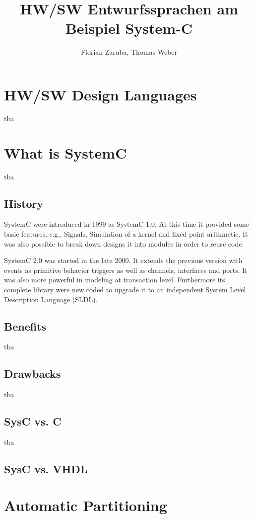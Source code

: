 \documentclass{article}
\begin{document}
	\title{HW/SW Entwurfssprachen am Beispiel System-C}
	\author{Florian Zaruba, Thomas Weber}

	\maketitle


	\section{HW/SW Design Languages}
	tba
	\section{What is SystemC}
	tba
	  \subsection{History}
	    SystemC were introduced in 1999 as SystemC 1.0. At this time it provided some basic features, e.g., Signals, Simulation of a kernel and fixed point arithmetic.
	    It was also possible to break down designs it into modules in order to reuse code.
	    
	    SystemC 2.0 was started in the late 2000. It extends the previous version with events as primitive behavior triggers as well as channels, interfaces and ports.
	    It was also more powerful in modeling at transaction level.
	    Furthermore its complete library were new coded to upgrade it to an independent System Level Description Language (SLDL).
	  \subsection{Benefits}
	  tba
	  \subsection{Drawbacks}
	  tba
	  \subsection{SysC vs. C}
	  tba
	  \subsection{SysC vs. VHDL}

	\section{Automatic Partitioning}
\end{document}
